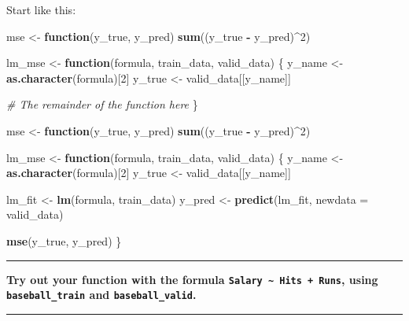 \documentclass[12pt,]{article}
\newenvironment{Shaded}{\begin{snugshade}}{\end{snugshade}}
\newcommand{\CommentTok}[1]{\textcolor[rgb]{0.56,0.35,0.01}{\textit{#1}}}
\newcommand{\ControlFlowTok}[1]{\textcolor[rgb]{0.13,0.29,0.53}{\textbf{#1}}}
\newcommand{\DataTypeTok}[1]{\textcolor[rgb]{0.13,0.29,0.53}{#1}}
\newcommand{\DecValTok}[1]{\textcolor[rgb]{0.00,0.00,0.81}{#1}}
\newcommand{\KeywordTok}[1]{\textcolor[rgb]{0.13,0.29,0.53}{\textbf{#1}}}
\newcommand{\NormalTok}[1]{#1}
\newcommand{\OperatorTok}[1]{\textcolor[rgb]{0.81,0.36,0.00}{\textbf{#1}}}
\newcommand{\StringTok}[1]{\textcolor[rgb]{0.31,0.60,0.02}{#1}}
\begin{document}
Start like this:

\begin{Shaded}
\begin{Highlighting}[]
\NormalTok{mse <-}\StringTok{ }\ControlFlowTok{function}\NormalTok{(y_true, y_pred) }\KeywordTok{sum}\NormalTok{((y_true }\OperatorTok{-}\StringTok{ }\NormalTok{y_pred)}\OperatorTok{^}\DecValTok{2}\NormalTok{)}

\NormalTok{lm_mse <-}\StringTok{ }\ControlFlowTok{function}\NormalTok{(formula, train_data, valid_data) \{}
\NormalTok{  y_name <-}\StringTok{ }\KeywordTok{as.character}\NormalTok{(formula)[}\DecValTok{2}\NormalTok{]}
\NormalTok{  y_true <-}\StringTok{ }\NormalTok{valid_data[[y_name]]}
  
  \CommentTok{# The remainder of the function here}
\NormalTok{\}}
\end{Highlighting}
\end{Shaded}

\begin{Shaded}
\begin{Highlighting}[]
\NormalTok{mse <-}\StringTok{ }\ControlFlowTok{function}\NormalTok{(y_true, y_pred) }\KeywordTok{sum}\NormalTok{((y_true }\OperatorTok{-}\StringTok{ }\NormalTok{y_pred)}\OperatorTok{^}\DecValTok{2}\NormalTok{)}

\NormalTok{lm_mse <-}\StringTok{ }\ControlFlowTok{function}\NormalTok{(formula, train_data, valid_data) \{}
\NormalTok{  y_name <-}\StringTok{ }\KeywordTok{as.character}\NormalTok{(formula)[}\DecValTok{2}\NormalTok{]}
\NormalTok{  y_true <-}\StringTok{ }\NormalTok{valid_data[[y_name]]}
  
\NormalTok{  lm_fit <-}\StringTok{ }\KeywordTok{lm}\NormalTok{(formula, train_data)}
\NormalTok{  y_pred <-}\StringTok{ }\KeywordTok{predict}\NormalTok{(lm_fit, }\DataTypeTok{newdata =}\NormalTok{ valid_data)}
  
  \KeywordTok{mse}\NormalTok{(y_true, y_pred)}
\NormalTok{\}}
\end{Highlighting}
\end{Shaded}

\begin{center}\rule{0.5\linewidth}{\linethickness}\end{center}

\textbf{Try out your function with the formula
\texttt{Salary\ \textasciitilde{}\ Hits\ +\ Runs}, using
\texttt{baseball\_train} and \texttt{baseball\_valid}.}

\begin{center}\rule{0.5\linewidth}{\linethickness}\end{center}
\end{document}
